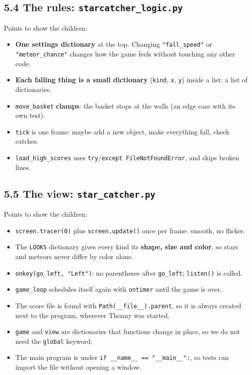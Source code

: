 \documentclass[level=2,teacher]{kidscode}
\begin{document}
\subsection{5.4 The rules: \texttt{starcatcher\_logic.py}}
Points to show the children:
\begin{itemize}[itemsep=1pt]
  \item \textbf{One settings dictionary} at the top. Changing \texttt{"fall\_speed"} or
        \texttt{"meteor\_chance"} changes how the game feels without touching any other code.
  \item \textbf{Each falling thing is a small dictionary} (\texttt{kind}, \texttt{x}, \texttt{y}) inside a
        list: a list of dictionaries.
  \item \texttt{move\_basket} \textbf{clamps}: the basket stops at the walls (an edge case with its own test).
  \item \texttt{tick} is one frame: maybe add a new object, make everything fall, check catches.
  \item \texttt{load\_high\_scores} uses \texttt{try}/\texttt{except FileNotFoundError}, and skips broken lines.
\end{itemize}

\subsection{5.5 The view: \texttt{star\_catcher.py}}
Points to show the children:
\begin{itemize}[itemsep=1pt]
  \item \texttt{screen.tracer(0)} plus \texttt{screen.update()} once per frame: smooth, no flicker.
  \item The \texttt{LOOKS} dictionary gives every kind its \textbf{shape, size and color}, so stars and
        meteors never differ by color alone.
  \item \texttt{onkey(go\_left, "Left")}: no parentheses after \texttt{go\_left}; \texttt{listen()} is called.
  \item \texttt{game\_loop} schedules itself again with \texttt{ontimer} until the game is over.
  \item The score file is found with \texttt{Path(\_\_file\_\_).parent}, so it is always created next to
        the program, wherever Thonny was started.
  \item \texttt{game} and \texttt{view} are dictionaries that functions change in place, so we do not need
        the \texttt{global} keyword.
  \item The main program is under \texttt{if \_\_name\_\_ == "\_\_main\_\_":}, so tests can import the file
        without opening a window.
\end{itemize}
\end{document}
